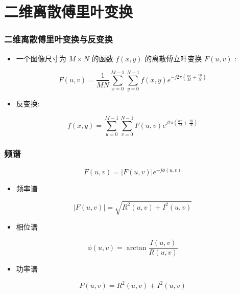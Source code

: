 \documentclass{beamer}
\begin{document}
\section{二维离散傅里叶变换}
\label{sec-3}
\begin{frame}
\frametitle{二维离散傅里叶变换与反变换}
\label{sec-3-1}

\begin{itemize}
\item 一个图像尺寸为 $M\times N$ 的函数 $f(x,y)$ 的离散傅立叶变换 $F(u,v)$ :
\end{itemize}
\[ F(u,v) =\frac{1}{MN}\sum_{x=0}^{M-1}\sum_{y=0}^{N-1}f(x,y)e^{-j2\pi(\frac{ux}{M}+\frac{vy}{N})}\]
\begin{itemize}
\item 反变换:
\end{itemize}
\[ f(x,y) =\sum_{u=0}^{M-1}\sum_{v=0}^{N-1}F(u,v)e^{j2\pi(\frac{ux}{M}+\frac{vy}{N})}\]
\end{frame}
\begin{frame}
\frametitle{频谱}
\label{sec-3-2}

\[ F(u,v) = |F(u,v)|e^{-j\phi(u,v)} \]
\begin{itemize}
\item 频率谱
\end{itemize}
\[ |F(u,v)| =\sqrt{R^2(u,v)+I^2(u,v)} \]
\begin{itemize}
\item 相位谱
\end{itemize}
\[ \phi(u,v) = \arctan\frac{I(u,v)}{R(u,v)} \]
\begin{itemize}
\item 功率谱
\end{itemize}
\[ P(u,v) =R^2(u,v)+I^2(u,v) \]
\end{frame}
\end{document}
